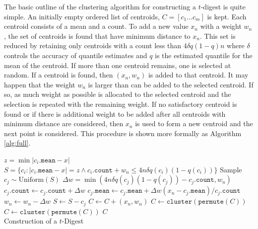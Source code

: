 \documentclass[11pt]{amsart}
\begin{document}
The basic outline of the clustering algorithm for constructing a $t$-digest is quite simple.  An initially empty ordered list of centroids, $C = [ c_1 \ldots c_m ]$ is kept.  Each centroid consists of a mean and a count.  To add a new value $x_n$ with a weight $w_n$, the set of centroids is found that have minimum distance to $x_n$.  This set is reduced by retaining only centroids with a count less than $4\delta q (1-q) n $ where $\delta$ controls the accuracy of quantile estimates and $q$ is the estimated quantile for the mean of the centroid.  If more than one centroid remains, one is selected at random.  If a centroid is found, then $(x_n,w_n)$ is added to that centroid.  It may happen that the weight $w_n$ is larger than can be added to the selected centroid.  If so, as much weight as possible is allocated to the selected centroid and the selection is repeated with the remaining weight.  If no satisfactory centroid is found or if there is additional weight to be added after all centroids with minimum distance are considered, then $x_n$ is used to form a new centroid and the next point is considered.  This procedure is shown more formally as Algorithm \ref{alg:full}.
 \begin{algorithm}[tb]
 \label{alg:full}
\SetNoFillComment
{}
 {
  $z = \min | c_i.\mathtt{mean} - x |$\;
  $S = \lbrace c_i  :  |c_i.\mathtt{mean} - x| = z \wedge c_i.\mathtt{count} + w_n \le 4n\delta q(c_i) (1-q(c_i)) \rbrace $\;
    {
       Sample $c_j \sim \mathrm{Uniform}( S)$\;
       $\Delta w = \min(4n\delta q(c_j) (1-q(c_j))-c_j.\mathtt{count}, w_n)$\;
       $c_j.\mathtt{count} \gets c_j.\mathtt{count} + \Delta w$\;
       $c_j.\mathtt{mean} \gets c_j.\mathtt{mean} + \Delta w (x_n - c_j.\mathtt{mean})/c_j.\mathtt{count}$\;
       $w_n \gets w_n - \Delta w$\;
       $S \gets S - c_j$
     } 
      {
        $C \gets C + (x_n, w_n)$\;
      }
       {
         $C \gets \mathtt{cluster}(\mathtt{permute}( C )) $\;
       }
} 
$C \gets \mathtt{cluster}(\mathtt{permute}( C )) $\;
\Return $ C $\\
\caption{Construction of a $t$-Digest}
\end{algorithm}
\end{document}

